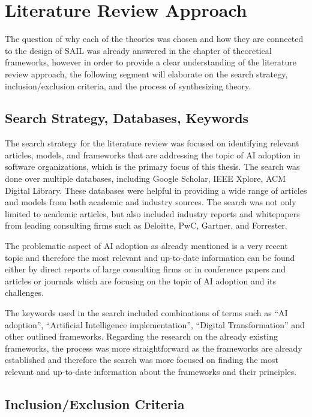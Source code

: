 \documentclass[]{imc-inf}
\begin{document}
\section{Literature Review
	Approach}\label{literature-review-approach}

The question of why each of the theories was chosen and how they are
connected to the design of SAIL was already answered in the chapter of
theoretical frameworks, however in order to provide a clear
understanding of the literature review approach, the following segment
will elaborate on the search strategy, inclusion/exclusion criteria, and
the process of synthesizing theory.

\subsection{Search Strategy, Databases,
	Keywords}\label{search-strategy-databases-keywords}

The search strategy for the literature review was focused on identifying
relevant articles, models, and frameworks that are addressing the topic
of AI adoption in software organizations, which is the primary focus of
this thesis. The search was done over multiple databases, including
Google Scholar, IEEE Xplore, ACM Digital Library. These databases were
helpful in providing a wide range of articles and models from both
academic and industry sources. The search was not only limited to
academic articles, but also included industry reports and whitepapers
from leading consulting firms such as Deloitte, PwC, Gartner, and
Forrester.

The problematic aspect of AI adoption as already mentioned is a very
recent topic and therefore the most relevant and up-to-date information
can be found either by direct reports of large consulting firms or in
conference papers and articles or journals which are focusing on the
topic of AI adoption and its challenges.

The keywords used in the search included combinations of terms such as
``AI adoption'', ``Artificial Intelligence implementation'', ``Digital
Transformation'' and other outlined frameworks. Regarding the research
on the already existing frameworks, the process was more straightforward
as the frameworks are already established and therefore the search was
more focused on finding the most relevant and up-to-date information
about the frameworks and their principles.

\subsection{Inclusion/Exclusion
	Criteria}\label{inclusionexclusion-criteria}
\end{document}
